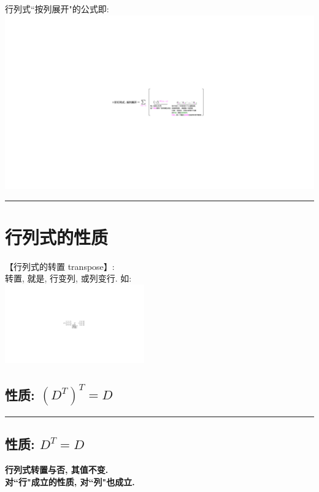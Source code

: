 \documentclass[UTF8]{ctexart}
\begin{document}
	行列式``按列展开"的公式即: \\
\includegraphics[width=1\textwidth]{img/0006.pdf}\\


\hrule

	
	
	\section{行列式的性质}
	
	【行列式的转置 transpose】:\\
	转置, 就是, 行变列, 或列变行. 如:\\
	\includegraphics[width=0.45\textwidth]{img/0007.pdf}\\
	
	
	
	\subsection{性质: $\left( D^T \right) ^T=D$	}
	
	
	\hrule
	
	\subsection{性质: $D^T=D$ }
	\textbf{行列式转置与否, 其值不变.} \\
	\textbf{对``行"成立的性质, 对``列"也成立.} \\
	
\end{document}
